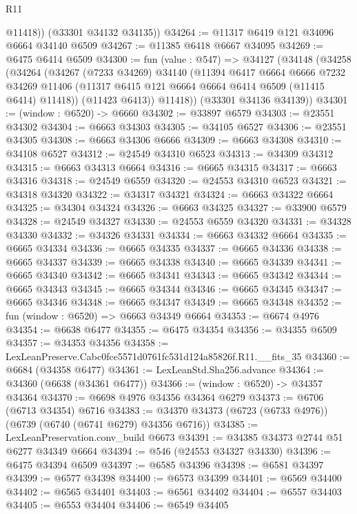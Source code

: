 \begin{lexlean}{R11}
\begin{coremodule}
          @11418))
      (@33301 @34132 @34135))
@34264 := @11317 @6419 @121 @34096 @6664 @34140 @6509
@34267 := @11385 @6418 @6667 @34095
@34269 := @6475 @6414 @6509
@34300 := fun (value : @547) =>
  @34127
    (@34148
      (@34258
        (@34264
          (@34267
            (@7233 @34269)
            @34140
            (@11394
              @6417
              @6664
              @6666
              @7232
              @34269
              @11406
              (@11317 @6415 @121 @6664 @6664 @6414 @6509 (@11415 @6414) @11418))
            (@11423 @6413))
          @11418))
      (@33301 @34136 @34139))
@34301 := (window : @6520) -> @6660
@34302 := @33897 @6579
@34303 := @23551 @34302
@34304 := @6663 @34303
@34305 := @34105 @6527
@34306 := @23551 @34305
@34308 := @6663 @34306 @6666
@34309 := @6663 @34308
@34310 := @34108 @6527
@34312 := @24549 @34310 @6523
@34313 := @34309 @34312
@34315 := @6663 @34313 @6664
@34316 := @6665 @34315
@34317 := @6663 @34316
@34318 := @24549 @6559
@34320 := @24553 @34310 @6523
@34321 := @34318 @34320
@34322 := @34317 @34321
@34324 := @6663 @34322 @6664
@34325 := @34304 @34324
@34326 := @6663 @34325
@34327 := @33900 @6579
@34328 := @24549 @34327
@34330 := @24553 @6559 @34320
@34331 := @34328 @34330
@34332 := @34326 @34331
@34334 := @6663 @34332 @6664
@34335 := @6665 @34334
@34336 := @6665 @34335
@34337 := @6665 @34336
@34338 := @6665 @34337
@34339 := @6665 @34338
@34340 := @6665 @34339
@34341 := @6665 @34340
@34342 := @6665 @34341
@34343 := @6665 @34342
@34344 := @6665 @34343
@34345 := @6665 @34344
@34346 := @6665 @34345
@34347 := @6665 @34346
@34348 := @6665 @34347
@34349 := @6665 @34348
@34352 := fun (window : @6520) => @6663 @34349 @6664
@34353 := @6674 @4976
@34354 := @6638 @6477
@34355 := @6475 @34354
@34356 := @34355 @6509
@34357 := @34353 @34356
@34358 := LexLeanPreserve.Cabc0fce5571d0761fc531d124a85826f.R11.__fits_35
@34360 := @6684 (@34358 @6477)
@34361 := LexLeanStd.Sha256.advance
@34364 := @34360 (@6638 (@34361 @6477))
@34366 := (window : @6520) -> @34357 @34364
@34370 := @6698 @4976 @34356 @34364 @6279
@34373 := @6706 (@6713 @34354) @6716
@34383 := @34370 @34373 (@6723 (@6733 @4976)) (@6739 (@6740 (@6741 @6279) @34356 @6716))
@34385 := LexLeanPreservation.conv_build @6673
@34391 := @34385 @34373 @2744 @51 @6277 @34349 @6664
@34394 := @546 (@24553 @34327 @34330)
@34396 := @6475 @34394 @6509
@34397 := @6585 @34396
@34398 := @6581 @34397
@34399 := @6577 @34398
@34400 := @6573 @34399
@34401 := @6569 @34400
@34402 := @6565 @34401
@34403 := @6561 @34402
@34404 := @6557 @34403
@34405 := @6553 @34404
@34406 := @6549 @34405

\end{coremodule}
\end{lexlean}
